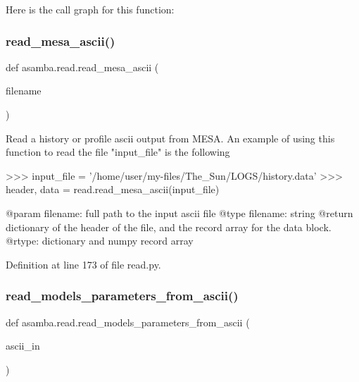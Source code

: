 Here is the call graph for this function\+:
\mbox{\label{namespaceasamba_1_1read_ae83b875713bb96212678b765231b4687}} 
\subsubsection{\texorpdfstring{read\+\_\+mesa\+\_\+ascii()}{read\_mesa\_ascii()}}
{\footnotesize\ttfamily def asamba.\+read.\+read\+\_\+mesa\+\_\+ascii (\begin{DoxyParamCaption}\item[{}]{filename }\end{DoxyParamCaption})}

\begin{DoxyVerb}Read a history or profile ascii output from MESA.
An example of using this function to read the file "input_file" is the following

>>> input_file = '/home/user/my-files/The_Sun/LOGS/history.data'
>>> header, data = read.read_mesa_ascii(input_file)

@param filename: full path to the input ascii file
@type filename: string
@return dictionary of the header of the file, and the record array for the data block. 
@rtype: dictionary and numpy record array
\end{DoxyVerb}
 

Definition at line 173 of file read.\+py.

\mbox{\label{namespaceasamba_1_1read_abb755ca6d69a403b2cbdc28d54eb0e24}} 
\subsubsection{\texorpdfstring{read\+\_\+models\+\_\+parameters\+\_\+from\+\_\+ascii()}{read\_models\_parameters\_from\_ascii()}}
{\footnotesize\ttfamily def asamba.\+read.\+read\+\_\+models\+\_\+parameters\+\_\+from\+\_\+ascii (\begin{DoxyParamCaption}\item[{}]{ascii\+\_\+in }\end{DoxyParamCaption})}

